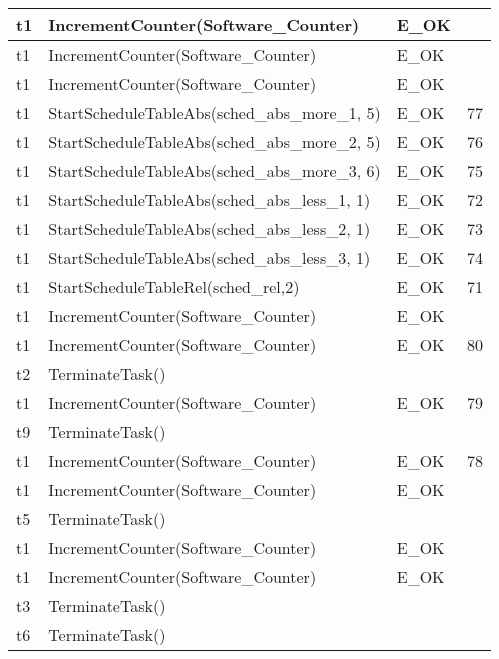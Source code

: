 \documentclass[10pt]{article}
\newlength{\Li}\settowidth{\Li}{Running}
\newlength{\Lii}\setlength{\Lii}{7cm}
\newlength{\Liiii}\setlength{\Liiii}{0.9cm}
\newlength{\Liii}\setlength{\Liii}{\textwidth} \addtolength{\Liii}{-\Li} \addtolength{\Liii}{-\Lii} \addtolength{\Liii}{-\Liiii}
\begin{document}
	\begin{supertabular}{|p{\Li}|p{\Lii}|p{\Liii}|p{\Liiii}|} \hline 
	t1		& IncrementCounter(Software\_Counter)										& E\_OK												& \\ \hline
	t1		& IncrementCounter(Software\_Counter)										& E\_OK												& \\ \hline
	t1		& IncrementCounter(Software\_Counter)										& E\_OK												& \\ \hline

	t1		& StartScheduleTableAbs(sched\_abs\_more\_1, 5)								& E\_OK												& 77 \\ \hline
	t1		& StartScheduleTableAbs(sched\_abs\_more\_2, 5)								& E\_OK												& 76 \\ \hline
	t1		& StartScheduleTableAbs(sched\_abs\_more\_3, 6)								& E\_OK												& 75 \\ \hline
	t1		& StartScheduleTableAbs(sched\_abs\_less\_1, 1)								& E\_OK												& 72 \\ \hline
	t1		& StartScheduleTableAbs(sched\_abs\_less\_2, 1)								& E\_OK												& 73 \\ \hline
	t1		& StartScheduleTableAbs(sched\_abs\_less\_3, 1)								& E\_OK												& 74 \\ \hline
	t1		& StartScheduleTableRel(sched\_rel,2)										& E\_OK												& 71 \\ \hline

	t1		& IncrementCounter(Software\_Counter)										& E\_OK												& \\ \hline
	t1		& IncrementCounter(Software\_Counter)										& E\_OK												& 80 \\ \hline
	t2		& TerminateTask()														& 													& \\ \hline

	t1		& IncrementCounter(Software\_Counter)										& E\_OK												& 79 \\ \hline
	t9		& TerminateTask()														& 													& \\ \hline

	t1		& IncrementCounter(Software\_Counter)										& E\_OK												& 78 \\ \hline
	t1		& IncrementCounter(Software\_Counter)										& E\_OK												& \\ \hline
	t5		& TerminateTask()														& 													& \\ \hline
	
	t1		& IncrementCounter(Software\_Counter)										& E\_OK												& \\ \hline
	t1		& IncrementCounter(Software\_Counter)										& E\_OK												& \\ \hline
	t3		& TerminateTask()														& 													& \\ \hline
	t6		& TerminateTask()														& 													& \\ \hline


\end{supertabular}
\end{document}
